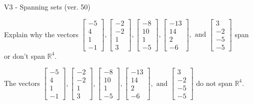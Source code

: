 \begin{exercise}
  \begin{exerciseTitle}V3 - Spanning sets (ver. 50)\end{exerciseTitle}
  \begin{exerciseStatement}
    Explain why the vectors \(\left[\begin{array}{r}
-5 \\
4 \\
1 \\
-1
\end{array}\right] , \left[\begin{array}{r}
-2 \\
-2 \\
1 \\
3
\end{array}\right] , \left[\begin{array}{r}
-8 \\
10 \\
1 \\
-5
\end{array}\right] , \left[\begin{array}{r}
-13 \\
14 \\
2 \\
-6
\end{array}\right] , \text{ and } \left[\begin{array}{r}
3 \\
-2 \\
-5 \\
-5
\end{array}\right]\) span or don't span \(\mathbb{R}^4\). 
	


  \end{exerciseStatement}
  \begin{exerciseAnswer}
   The vectors \(\left[\begin{array}{r}
-5 \\
4 \\
1 \\
-1
\end{array}\right] , \left[\begin{array}{r}
-2 \\
-2 \\
1 \\
3
\end{array}\right] , \left[\begin{array}{r}
-8 \\
10 \\
1 \\
-5
\end{array}\right] , \left[\begin{array}{r}
-13 \\
14 \\
2 \\
-6
\end{array}\right] , \text{ and } \left[\begin{array}{r}
3 \\
-2 \\
-5 \\
-5
\end{array}\right]\) 
  	 do not  
	span \(\mathbb{R}^4\).
  



\end{exerciseAnswer}
\end{exercise}
